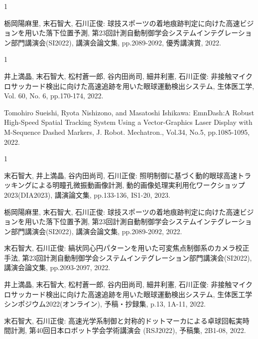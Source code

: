 \begin{受賞}{1}

栃岡陽麻里, 末石智大, 石川正俊: 球技スポーツの着地痕跡判定に向けた高速ビジョンを用いた落下位置予測, 第23回計測自動制御学会システムインテグレーション部門講演会(SI2022), 講演会論文集, pp.2089-2092, 優秀講演賞, 2022.

\end{受賞}

\begin{雑誌論文}{1}

井上満晶, 末石智大, 松村蒼一郎, 谷内田尚司, 細井利憲, 石川正俊: 非接触マイクロサッカード検出に向けた高速追跡を用いた眼球運動検出システム, 生体医工学, Vol. 60, No. 6, pp.170-174, 2022.

Tomohiro Sueishi, Ryota Nishizono, and Masatoshi Ishikawa: EmnDash:A Robust High-Speed Spatial Tracking System Using a Vector-Graphics Laser Display with M-Sequence Dashed Markers, J. Robot. Mechatron., Vol.34, No.5, pp.1085-1095, 2022.

\end{雑誌論文}

\begin{発表}{1}

末石智大, 井上満晶, 谷内田尚司, 石川正俊: 照明制御に基づく動的眼球高速トラッキングによる明瞳孔微振動画像計測, 動的画像処理実利用化ワークショップ2023(DIA2023), 講演論文集, pp.133-136, IS1-20, 2023.

栃岡陽麻里, 末石智大, 石川正俊: 球技スポーツの着地痕跡判定に向けた高速ビジョンを用いた落下位置予測, 第23回計測自動制御学会システムインテグレーション部門講演会(SI2022), 講演会論文集, pp.2089-2092, 2022.

末石智大, 石川正俊: 縞状同心円パターンを用いた可変焦点制御系のカメラ校正手法, 第23回計測自動制御学会システムインテグレーション部門講演会(SI2022), 講演会論文集, pp.2093-2097, 2022.

井上満晶, 末石智大, 松村蒼一郎, 谷内田尚司, 細井利憲, 石川正俊: 非接触マイクロサッカード検出に向けた高速追跡を用いた眼球運動検出システム, 生体医工学シンポジウム2022(オンライン), 予稿・抄録集, p.13, 1A-11, 2022.

末石智大, 石川正俊: 高速光学系制御と対称的ドットマーカによる卓球回転実時間計測, 第40回日本ロボット学会学術講演会 (RSJ2022), 予稿集, 2B1-08, 2022.

\end{発表}
